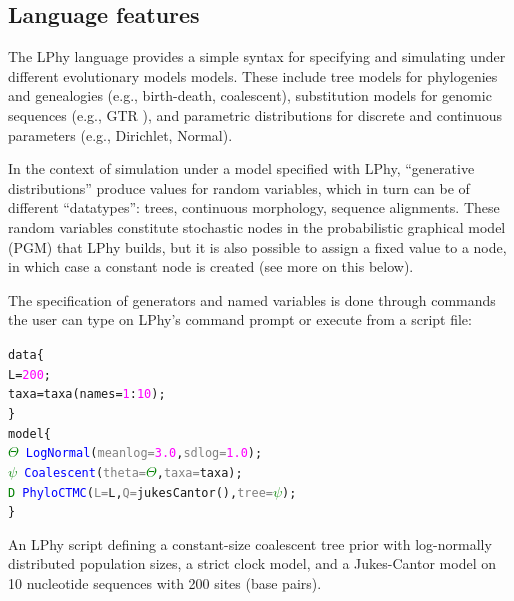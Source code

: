 \documentclass[10pt,letterpaper,table]{article}
\begin{document}
\subsection{Language features}
The LPhy language provides a simple syntax for specifying and simulating under different evolutionary models models.
These include tree models for phylogenies and genealogies (e.g., birth-death, coalescent), substitution models for genomic sequences (e.g., GTR \cite{gtr}), and parametric distributions for discrete and continuous parameters (e.g., Dirichlet, Normal). 


In the context of simulation under a model specified with LPhy, ``generative distributions'' produce values for random variables, which in turn can be of different ``datatypes'': trees, continuous morphology, sequence alignments.
These random variables constitute stochastic nodes in the probabilistic graphical model (PGM) that LPhy builds, but it is also possible to assign a fixed value to a node, in which case a constant node is created (see more on this below).


The specification of generators and named variables is done through commands the user can type on LPhy's command prompt or execute from a script file:

{
  \small
  \begin{listing}
    \begin{alltt}
  data \{
    L = \textcolor{magenta}{200};
    taxa = \textcolor{magenta!80!black}{taxa}(names=\textcolor{magenta}{1}:\textcolor{magenta}{10});
  \}
  model \{
    \textcolor{green}{\(\Theta\)} ~ \textcolor{blue}{LogNormal}(\textcolor{gray}{meanlog=}\textcolor{magenta}{3.0}, \textcolor{gray}{sdlog=}\textcolor{magenta}{1.0});
    \textcolor{green}{\(\psi\)} ~ \textcolor{blue}{Coalescent}(\textcolor{gray}{theta=}\textcolor{green}{\(\Theta\)}, \textcolor{gray}{taxa=}taxa);
    \textcolor{green}{D} ~ \textcolor{blue}{PhyloCTMC}(\textcolor{gray}{L=}L, \textcolor{gray}{Q=}\textcolor{magenta!80!black}{jukesCantor}(), \textcolor{gray}{tree=}\textcolor{green}{\(\psi\)});
  \}
    \end{alltt}
    \caption{\small{An LPhy script defining a constant-size coalescent tree prior with log-normally distributed population sizes, a strict clock model, and a Jukes-Cantor model on 10 nucleotide sequences with 200 sites (base pairs).}}
    \label{lphy:jccoal}
  \end{listing}
}
\end{document}
